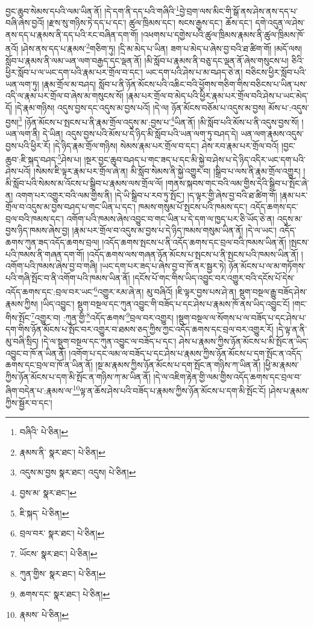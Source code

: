བྱང་ཆུབ་སེམས་དཔའི་ལམ་ཡིན་ནོ། །དེ་དག་ནི་དད་པའི་གཞིའི་\footnote{བཞིའི་  པེ་ཅིན། }བྱེ་བྲག་ལས་མིང་གི་སྒོ་ནས་ཤེས་ནས་དད་པ་བཞི་ཞེས་བྱའོ། །རྫས་སུ་གཉིས་ཏེ་དད་པ་དང་། ཚུལ་ཁྲིམས་དང་། སངས་རྒྱས་དང་། ཆོས་དང་། དགེ་འདུན་ལ་ཤེས་ནས་དད་པ་རྣམས་ནི་དད་པའི་རང་བཞིན་དག་གོ། །འཕགས་པ་དགྱེས་པའི་ཚུལ་ཁྲིམས་རྣམས་ནི་ཚུལ་ཁྲིམས་ཁོ་ནའོ། །ཤེས་ནས་དད་པ་རྣམས་\footnote{རྣམས་ནི་  སྣར་ཐང་།  པེ་ཅིན། }གཅིག་ཏུ། །དྲི་མ་མེད་པ་ཡིན། ཟག་པ་མེད་པ་ཞེས་བྱ་བའི་ཐ་ཚིག་གོ། །མདོ་ལས། སློབ་པ་རྣམས་ནི་ལམ་ཡན་ལག་བརྒྱད་དང་ལྡན་ནོ། །མི་སློབ་པ་རྣམས་ནི་བཅུ་དང་ལྡན་ནོ་ཞེས་གསུངས་པ། ཅིའི་ཕྱིར་སློབ་པ་ལ་ཡང་དག་པའི་རྣམ་པར་གྲོལ་བ་དང་། ཡང་དག་པའི་ཤེས་པ་མ་བཤད་ཅེ་ན། བཅིངས་ཕྱིར་སློབ་པའི་ཡན་ལག་ཏུ། །རྣམ་གྲོལ་མ་བཤད། སློབ་པ་ནི་ཉོན་མོངས་པའི་འཆིང་བའི་ཕྱོགས་གཅིག་གིས་བཅིངས་པ་ཡིན་པས་འདི་ལ་རྣམ་པར་གྲོལ་བ་ཞེས་མ་གསུངས་སོ། །རྣམ་པར་གྲོལ་བ་མེད་པའི་ཕྱིར་རྣམ་པར་གྲོལ་བའི་ཤེས་པ་ཡང་མེད་དོ། །དེ་རྣམ་གཉིས། འདུས་བྱས་དང་འདུས་མ་བྱས་པའོ། །དེ་ལ། ཉོན་མོངས་བཅོམ་པ་འདུས་མ་བྱས། མོས་པ་:འདུས་བྱས།\footnote{འདུས་མ་བྱས  སྣར་ཐང་། འདུས།  པེ་ཅིན། } །ཉོན་མོངས་པ་སྤངས་པ་ནི་རྣམ་གྲོལ་འདུས་མ་:བྱས་པ་\footnote{བྱས་མ་  སྣར་ཐང་། }ཡིན་ནོ། །མི་སློབ་པའི་མོས་པ་ནི་འདུས་བྱས་སོ། །ཡན་ལག་ནི། དེ་ཡིན། འདུས་བྱས་པའི་མོས་པ་དེ་ཉིད་མི་སློབ་པའི་ཡན་ལག་ཏུ་བཤད་དེ། ཡན་ལག་རྣམས་འདུས་བྱས་པའི་ཕྱིར་རོ། །དེ་ཉིད་རྣམ་གྲོལ་གཉིས། སེམས་རྣམ་པར་གྲོལ་བ་དང་། ཤེས་རབ་རྣམ་པར་གྲོལ་བའོ། །བྱང་ཆུབ་:ཇི་སྐད་བཤད་\footnote{ཇི་སྐད་  པེ་ཅིན། }ཤེས་པ། །སྔར་བྱང་ཆུབ་བཤད་པ་གང་ཟད་པ་དང་མི་སྐྱེ་བ་ཤེས་པ་དེ་ཉིད་འདིར་ཡང་དག་པའི་ཤེས་པའོ། །སེམས་ཇི་ལྟར་རྣམ་པར་གྲོལ་ཞེ་ན། མི་སློབ་སེམས་ནི་སྐྱེ་འགྱུར་བ། །སྒྲིབ་པ་ལས་ནི་རྣམ་གྲོལ་འགྱུར། །མི་སློབ་པའི་སེམས་མ་འོངས་པ་སྒྲིབ་པ་རྣམས་ལས་གྲོལ་ལོ། །གནས་སྐབས་གང་བའི་ལམ་གྱིས་དེའི་སྒྲིབ་པ་སྤོང་ཞེ་ན། འགག་པར་འགྱུར་བའི་ལམ་གྱིས་ནི། །དེ་ཡི་སྒྲིབ་པ་རབ་ཏུ་སྤོང་། །ད་ལྟར་གྱི་ཞེས་བྱ་བའི་ཐ་ཚིག་གོ། །རྣམ་པར་གྲོལ་བ་འདུས་མ་བྱས་བཤད་པ་གང་ཡིན་པ་དང་། ཁམས་གསུམ་པོ་སྤངས་པའི་ཁམས་དང་། འདོད་ཆགས་དང་བྲལ་བའི་ཁམས་དང་། འགོག་པའི་ཁམས་ཞེས་འབྱུང་བ་གང་ཡིན་པ་དེ་དག་ལ་ཁྱད་པར་ཅི་ཡོད་ཅེ་ན། འདུས་མ་བྱས་ཉིད་ཁམས་ཞེས་བྱ། །རྣམ་པར་གྲོལ་བ་འདུས་མ་བྱས་པ་དེ་ཉིད་ཁམས་གསུམ་ཡིན་ནོ། །དེ་ལ་ཡང་། འདོད་ཆགས་ཀུན་ཟད་འདོད་ཆགས་བྲལ། །འདོད་ཆགས་སྤངས་པ་ནི་འདོད་ཆགས་དང་བྲལ་བའི་ཁམས་ཡིན་ནོ། །སྤངས་པའི་ཁམས་ནི་གཞན་དག་གོ། །འདོད་ཆགས་ལས་གཞན་ཉོན་མོངས་པ་སྤངས་པ་ནི་སྤངས་པའི་ཁམས་ཡིན་ནོ། །འགོག་པའི་ཁམས་ཞེས་བྱ་བ་གཞི། །ཡང་དག་པར་ཟད་པ་ཞེས་བྱ་བ་ཁོ་ནར་སྦྱར་ཏེ། ཉོན་མོངས་པ་ལ་མ་གཏོགས་པའི་གཞི་སྤོང་བ་ནི་འགོག་པའི་ཁམས་ཡིན་ནོ། །དངོས་པོ་གང་གིས་ཡིད་འབྱུང་བར་འགྱུར་བའི་དངོས་པོ་དེས་འདོད་ཆགས་དང་:བྲལ་བར་ཡང་\footnote{བྲལ་བར་  སྣར་ཐང་།  པེ་ཅིན། }འགྱུར་རམ་ཞེ་ན། མུ་བཞིའོ། །ཇི་ལྟར་བྱས་པས་ཤེ་ན། སྡུག་བསྔལ་རྒྱུ་བཟོད་ཤེས་རྣམས་ཀྱིས། །ཡིད་འབྱུང་། སྡུག་བསྔལ་དང་ཀུན་འབྱུང་གི་བཟོད་པ་དང་ཤེས་པ་རྣམས་ཁོ་ནས་ཡིད་འབྱུང་ངོ། །གང་གིས་སྤོང་\footnote{ཡོངས་  སྣར་ཐང་།  པེ་ཅིན། }འགྱུར་བ། :ཀུན་གྱི་\footnote{ཀུན་གྱིས་  སྣར་ཐང་།  པེ་ཅིན། }འདོད་ཆགས་\footnote{ཆགས་དང་  སྣར་ཐང་།  པེ་ཅིན། }བྲལ་བར་འགྱུར། །སྡུག་བསྔལ་ལ་སོགས་པ་ལ་བཟོད་པ་དང་ཤེས་པ་དག་གིས་ཉོན་མོངས་པ་སྤོང་བར་འགྱུར་བ་ཐམས་ཅད་ཀྱིས་ཀྱང་འདོད་ཆགས་དང་བྲལ་བར་འགྱུར་རོ། །དེ་ལྟ་ན་ནི་མུ་བཞི་སྲིད། །དེ་ལ་སྡུག་བསྔལ་དང་ཀུན་འབྱུང་ལ་བཟོད་པ་དང་། ཤེས་པ་རྣམས་ཀྱིས་ཉོན་མོངས་པ་མི་སྤོང་ན་ཡིད་འབྱུང་བ་ཁོ་ན་ཡིན་ནོ། །འགོག་པ་དང་ལམ་ལ་བཟོད་པ་དང་ཤེས་པ་རྣམས་ཀྱིས་ཉོན་མོངས་པ་དག་སྤོང་ན་འདོད་ཆགས་དང་བྲལ་བ་ཁོ་ན་ཡིན་ནོ། །སྔ་མ་རྣམས་ཀྱིས་ཉོན་མོངས་པ་དག་སྤོང་ན་གཉིས་ཀ་ཡིན་ནོ། །ཕྱི་མ་རྣམས་ཀྱིས་ཉོན་མོངས་པ་དག་མི་སྤོང་ན་གཉིས་ཀ་མ་ཡིན་ནོ། །དེ་ལ་འཇིག་རྟེན་གྱི་ལམ་གྱིས་འདོད་ཆགས་དང་བྲལ་བ་ཞིག་བདེན་པ་:རྣམས་ལ་\footnote{རྣམས་  པེ་ཅིན། }ལྟ་ན་ཆོས་ཤེས་པའི་བཟོད་པ་རྣམས་ཀྱིས་ཉོན་མོངས་པ་དག་མི་སྤོང་ངོ། །ཤེས་པ་རྣམས་ཀྱིས་སྦྱོར་བ་དང་། 